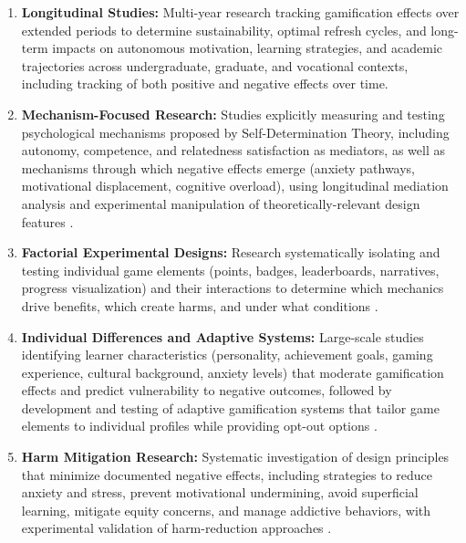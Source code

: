 \documentclass[12pt,a4paper]{article}
\begin{document}
\begin{enumerate}
    \item \textbf{Longitudinal Studies:} Multi-year research tracking gamification effects over extended periods to determine sustainability, optimal refresh cycles, and long-term impacts on autonomous motivation, learning strategies, and academic trajectories across undergraduate, graduate, and vocational contexts, including tracking of both positive and negative effects over time.
    
    \item \textbf{Mechanism-Focused Research:} Studies explicitly measuring and testing psychological mechanisms proposed by Self-Determination Theory, including autonomy, competence, and relatedness satisfaction as mediators, as well as mechanisms through which negative effects emerge (anxiety pathways, motivational displacement, cognitive overload), using longitudinal mediation analysis and experimental manipulation of theoretically-relevant design features \parencite{ryan2025,dahri2024,surendeleg2024}.
    
    \item \textbf{Factorial Experimental Designs:} Research systematically isolating and testing individual game elements (points, badges, leaderboards, narratives, progress visualization) and their interactions to determine which mechanics drive benefits, which create harms, and under what conditions \parencite{ojonuba2023,wang2023,surendeleg2024}.
    
    \item \textbf{Individual Differences and Adaptive Systems:} Large-scale studies identifying learner characteristics (personality, achievement goals, gaming experience, cultural background, anxiety levels) that moderate gamification effects and predict vulnerability to negative outcomes, followed by development and testing of adaptive gamification systems that tailor game elements to individual profiles while providing opt-out options \parencite{ryan2025,ojonuba2023,surendeleg2024}.
    
    \item \textbf{Harm Mitigation Research:} Systematic investigation of design principles that minimize documented negative effects, including strategies to reduce anxiety and stress, prevent motivational undermining, avoid superficial learning, mitigate equity concerns, and manage addictive behaviors, with experimental validation of harm-reduction approaches \parencite{surendeleg2024}.
    

\end{enumerate}
\end{document}
